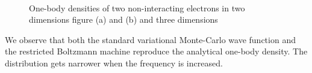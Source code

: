 \begin{figure} [h]%
	\centering
	\\
	
	\caption{One-body densities of two non-interacting electrons in two dimensions figure (a) and (b) and three dimensions}%
	\label{fig:OB_nointeraction1}
\end{figure}

We observe that both the standard variational Monte-Carlo wave function and the restricted Boltzmann machine reproduce the analytical one-body density. The distribution gets narrower when the frequency is increased. 

